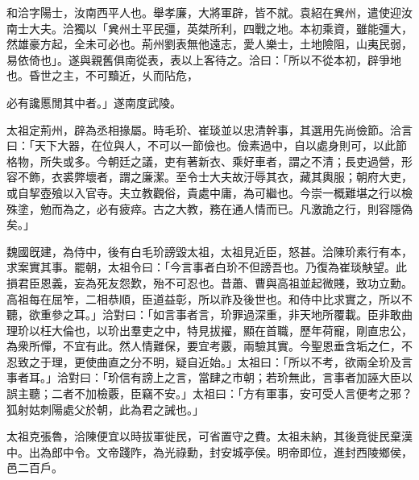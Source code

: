 \begin{pinyinscope}
 
 
 和洽字陽士，汝南西平人也。舉孝廉，大將軍辟，皆不就。袁紹在兾州，遣使迎汝南士大夫。洽獨以「兾州土平民彊，英桀所利，四戰之地。本初乘資，雖能彊大，然雄豪方起，全未可必也。荊州劉表無他遠志，愛人樂士，土地險阻，山夷民弱，易依倚也」。遂與親舊俱南從表，表以上客待之。洽曰：「所以不從本初，辟爭地也。昏世之主，不可黷近，乆而阽危，
 
 
 必有讒慝閒其中者。」遂南度武陵。
 
 
太祖定荊州，辟為丞相掾屬。時毛玠、崔琰並以忠清幹事，其選用先尚儉節。洽言曰：「天下大器，在位與人，不可以一節儉也。儉素過中，自以處身則可，以此節格物，所失或多。今朝廷之議，吏有著新衣、乘好車者，謂之不清；長吏過營，形容不飾，衣裘弊壞者，謂之廉潔。至令士大夫故汙辱其衣，藏其輿服；朝府大吏，或自挈壺飱以入官寺。夫立教觀俗，貴處中庸，為可繼也。今崇一概難堪之行以檢殊塗，勉而為之，必有疲瘁。古之大教，務在通人情而已。凡激詭之行，則容隱偽矣。」
 
 
 
 
 魏國旣建，為侍中，後有白毛玠謗毀太祖，太祖見近臣，怒甚。洽陳玠素行有本，求案實其事。罷朝，太祖令曰：「今言事者白玠不但謗吾也。乃復為崔琰觖望。此損君臣恩義，妄為死友怨歎，殆不可忍也。昔蕭、曹與高祖並起微賤，致功立勳。高祖每在屈笮，二相恭順，臣道益彰，所以祚及後世也。和侍中比求實之，所以不聽，欲重參之耳。」洽對曰：「如言事者言，玠罪過深重，非天地所覆載。臣非敢曲理玠以枉大倫也，以玠出羣吏之中，特見拔擢，顯在首職，歷年荷寵，剛直忠公，為衆所憚，不宜有此。然人情難保，要宜考覈，兩驗其實。今聖恩垂含垢之仁，不忍致之于理，更使曲直之分不明，疑自近始。」太祖曰：「所以不考，欲兩全玠及言事者耳。」洽對曰：「玠信有謗上之言，當肆之巿朝；若玠無此，言事者加誣大臣以誤主聽；二者不加檢覈，臣竊不安。」太祖曰：「方有軍事，安可受人言便考之邪？狐射姑刺陽處父於朝，此為君之誡也。」
 
 
 
 
 太祖克張魯，洽陳便宜以時拔軍徙民，可省置守之費。太祖未納，其後竟徙民棄漢中。出為郎中令。文帝踐阼，為光祿勳，封安城亭侯。明帝即位，進封西陵鄉侯，邑二百戶。
 
 
 

\end{pinyinscope}

